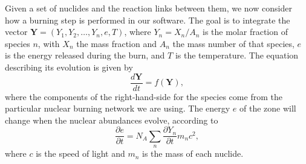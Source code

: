 \documentclass[twocolumn,numberedappendix]{../aastex6}
\begin{document}
Given a set of nuclides and the reaction links between them, we now consider
how a burning step is performed in our software. The goal is to integrate the
vector ${\bm{Y}} = (Y_1, Y_2, \ldots, Y_n, e, T)$, where $Y_{n} = X_{n} / A_{n}$
is the molar fraction of species $n$, with $X_n$ the mass fraction and $A_n$ the
mass number of that species, $e$ is the energy released during the burn, and
$T$ is the temperature. The equation describing its evolution is given by
\begin{equation}
  \frac{d\bm{Y}}{dt} = f(\mathbf{Y}),
\end{equation}
where the components of the right-hand-side for the species come from the particular
nuclear burning network we are using. The energy $e$ of the zone
will change when the nuclear abundances evolve, according to
\begin{equation}
  \frac{\partial e}{\partial t} = N_A \sum_{n} \frac{\partial Y_{n}}{\partial t} m_{n} c^2,
\end{equation}
where $c$ is the speed of light and $m_n$ is the mass of each nuclide.
\end{document}
